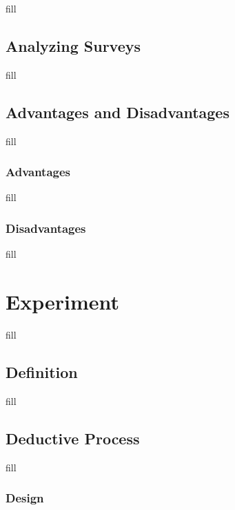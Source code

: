\documentclass[
  b5paper]{book}
\begin{document}
fill

\hypertarget{analyzing-surveys}{%
\section{Analyzing Surveys}\label{analyzing-surveys}}

fill

\hypertarget{advantages-and-disadvantages}{%
\section{Advantages and Disadvantages}\label{advantages-and-disadvantages}}

fill

\hypertarget{advantages}{%
\subsection*{Advantages}\label{advantages}}

fill

\hypertarget{disadvantages}{%
\subsection*{Disadvantages}\label{disadvantages}}

fill

\hypertarget{experiment-1}{%
\chapter{Experiment}\label{experiment-1}}

fill

\hypertarget{definition-1}{%
\section{Definition}\label{definition-1}}

fill

\hypertarget{deductive-process}{%
\section{Deductive Process}\label{deductive-process}}

fill

\hypertarget{design}{%
\subsection*{Design}\label{design}}
\end{document}
